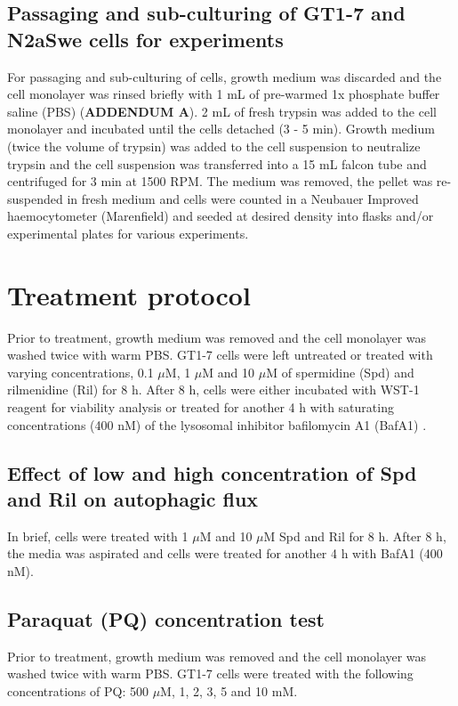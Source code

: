\subsection{Passaging and sub-culturing of GT1-7 and N2aSwe cells for experiments}\label{sec:Passaging_sub-culturing_GT1-7_N2aSwe_experiments}
For passaging and sub-culturing of cells, growth medium was discarded and the cell monolayer was rinsed briefly with 1 mL of pre-warmed 1x phosphate buffer saline (PBS) (\textbf{ADDENDUM A}). 2 mL of fresh trypsin was added to the cell monolayer and incubated until the cells detached (3 - 5 min). Growth medium (twice the volume of trypsin) was added to the cell suspension to neutralize trypsin and the cell suspension was transferred into a 15 mL falcon tube and centrifuged for 3 min at 1500 RPM. The medium was removed, the pellet was re-suspended in fresh medium and cells were counted in a Neubauer Improved haemocytometer (Marenfield) and seeded at desired density into flasks and/or experimental plates for various experiments.

\section{Treatment protocol}
Prior to treatment, growth medium was removed and the cell monolayer was washed twice with warm PBS. GT1-7 cells were left untreated or treated with varying concentrations, 0.1 $\mu$M, 1 $\mu$M and 10 $\mu$M of spermidine (Spd) and rilmenidine (Ril) for 8 h. After 8 h, cells were either incubated with WST-1 reagent for viability analysis or treated for another 4 h with saturating concentrations (400 nM) of the lysosomal inhibitor bafilomycin A1 (BafA1) \citep{DuToit2018b,loos2014}.

\subsection{Effect of low and high concentration of Spd and Ril on autophagic flux}\label{sec:Effect_low_high_Spd_Ril_autophagic flux}
In brief, cells were treated with 1 $\mu$M and 10 $\mu$M Spd and Ril for 8 h. After 8 h, the media was aspirated and cells were treated for another 4 h with BafA1 (400 nM).

\subsection{Paraquat (PQ) concentration test}
Prior to treatment, growth medium was removed and the cell monolayer was washed twice with warm PBS. GT1-7 cells were treated with the following concentrations of PQ: 500 $\mu$M, 1, 2, 3, 5 and 10 mM. 


